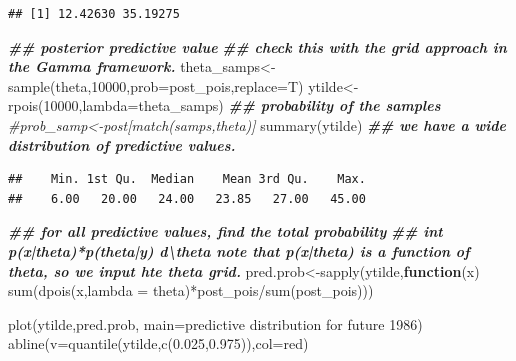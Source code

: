 \documentclass[
]{book}
\newenvironment{Shaded}{\begin{snugshade}}{\end{snugshade}}
\newcommand{\AttributeTok}[1]{\textcolor[rgb]{0.77,0.63,0.00}{#1}}
\newcommand{\CommentTok}[1]{\textcolor[rgb]{0.56,0.35,0.01}{\textit{#1}}}
\newcommand{\ControlFlowTok}[1]{\textcolor[rgb]{0.13,0.29,0.53}{\textbf{#1}}}
\newcommand{\DecValTok}[1]{\textcolor[rgb]{0.00,0.00,0.81}{#1}}
\newcommand{\DocumentationTok}[1]{\textcolor[rgb]{0.56,0.35,0.01}{\textbf{\textit{#1}}}}
\newcommand{\FloatTok}[1]{\textcolor[rgb]{0.00,0.00,0.81}{#1}}
\newcommand{\FunctionTok}[1]{\textcolor[rgb]{0.00,0.00,0.00}{#1}}
\newcommand{\NormalTok}[1]{#1}
\newcommand{\OtherTok}[1]{\textcolor[rgb]{0.56,0.35,0.01}{#1}}
\newcommand{\SpecialCharTok}[1]{\textcolor[rgb]{0.00,0.00,0.00}{#1}}
\newcommand{\StringTok}[1]{\textcolor[rgb]{0.31,0.60,0.02}{#1}}
\theoremstyle{definition}
\theoremstyle{definition}
\theoremstyle{definition}
\theoremstyle{definition}
\theoremstyle{remark}
\begin{document}
\begin{verbatim}
## [1] 12.42630 35.19275
\end{verbatim}

\begin{Shaded}
\begin{Highlighting}[]
\DocumentationTok{\#\# posterior predictive value}
   \DocumentationTok{\#\# check this with the grid approach in the Gamma framework.  }
\NormalTok{  theta\_samps}\OtherTok{\textless{}{-}}\FunctionTok{sample}\NormalTok{(theta,}\DecValTok{10000}\NormalTok{,}\AttributeTok{prob=}\NormalTok{post\_pois,}\AttributeTok{replace=}\NormalTok{T)}
\NormalTok{   ytilde}\OtherTok{\textless{}{-}}\FunctionTok{rpois}\NormalTok{(}\DecValTok{10000}\NormalTok{,}\AttributeTok{lambda=}\NormalTok{theta\_samps) }
 \DocumentationTok{\#\# probability of the samples }
 \CommentTok{\#prob\_samp\textless{}{-}post[match(samps,theta)]}
  \FunctionTok{summary}\NormalTok{(ytilde) }\DocumentationTok{\#\# we have a wide distribution of predictive values.}
\end{Highlighting}
\end{Shaded}

\begin{verbatim}
##    Min. 1st Qu.  Median    Mean 3rd Qu.    Max. 
##    6.00   20.00   24.00   23.85   27.00   45.00
\end{verbatim}

\begin{Shaded}
\begin{Highlighting}[]
\DocumentationTok{\#\# for all predictive values,  find the total probability  }
   \DocumentationTok{\#\# int p(x|theta)*p(theta|y) d\textbackslash{}theta  note that p(x|theta) is a function of theta, so we input hte theta grid.}
\NormalTok{ pred.prob}\OtherTok{\textless{}{-}}\FunctionTok{sapply}\NormalTok{(ytilde,}\ControlFlowTok{function}\NormalTok{(x) }\FunctionTok{sum}\NormalTok{(}\FunctionTok{dpois}\NormalTok{(x,}\AttributeTok{lambda =}\NormalTok{ theta)}\SpecialCharTok{*}\NormalTok{post\_pois}\SpecialCharTok{/}\FunctionTok{sum}\NormalTok{(post\_pois)))  }
  
 \FunctionTok{plot}\NormalTok{(ytilde,pred.prob, }\AttributeTok{main=}\StringTok{\textquotesingle{}predictive distribution for future 1986\textquotesingle{}}\NormalTok{)}
 \FunctionTok{abline}\NormalTok{(}\AttributeTok{v=}\FunctionTok{quantile}\NormalTok{(ytilde,}\FunctionTok{c}\NormalTok{(}\FloatTok{0.025}\NormalTok{,}\FloatTok{0.975}\NormalTok{)),}\AttributeTok{col=}\StringTok{\textquotesingle{}red\textquotesingle{}}\NormalTok{)}
\end{Highlighting}
\end{Shaded}
\end{document}
